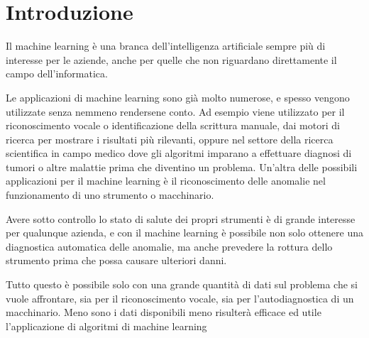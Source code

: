 \chapter{Introduzione}
\label{introduction}

Il machine learning è una branca dell'intelligenza artificiale sempre più di interesse per le aziende, anche per quelle che non riguardano direttamente il campo dell'informatica.

Le applicazioni di machine learning sono già molto numerose, e spesso vengono utilizzate senza nemmeno rendersene conto.
Ad esempio viene utilizzato per il riconoscimento vocale o identificazione della scrittura manuale, dai motori di ricerca per mostrare i risultati più rilevanti, oppure nel settore della ricerca scientifica in campo medico dove gli algoritmi imparano a effettuare diagnosi di tumori o altre malattie prima che diventino un problema. Un'altra delle possibili applicazioni per il machine learning è il riconoscimento delle anomalie nel funzionamento di uno strumento o macchinario.

Avere sotto controllo lo stato di salute dei propri strumenti è di grande interesse per qualunque azienda, e con il machine learning è possibile non solo ottenere una diagnostica automatica delle anomalie, ma anche prevedere la rottura dello strumento prima che possa causare ulteriori danni.

Tutto questo è possibile solo con una grande quantità di dati sul problema che si vuole affrontare, sia per il riconoscimento vocale, sia per l'autodiagnostica di un macchinario. Meno sono i dati disponibili meno risulterà efficace ed utile l'applicazione di algoritmi di machine learning